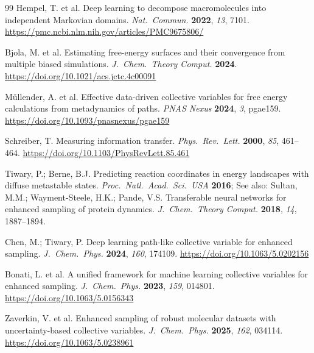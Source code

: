 \documentclass[12pt, a4paper]{article}
\begin{document}
\begin{thebibliography}{99}
Hempel, T. et al.
\newblock Deep learning to decompose macromolecules into independent Markovian domains.
\newblock \emph{Nat.\ Commun.} \textbf{2022}, \emph{13}, 7101.
\newblock \url{https://pmc.ncbi.nlm.nih.gov/articles/PMC9675806/}

Bjola, M. et al.
\newblock Estimating free-energy surfaces and their convergence from multiple biased simulations.
\newblock \emph{J.\ Chem.\ Theory Comput.} \textbf{2024}.
\newblock \url{https://doi.org/10.1021/acs.jctc.4c00091}

M\"{u}llender, A. et al.
\newblock Effective data-driven collective variables for free energy calculations from metadynamics of paths.
\newblock \emph{PNAS Nexus} \textbf{2024}, \emph{3}, pgae159.
\newblock \url{https://doi.org/10.1093/pnasnexus/pgae159}

Schreiber, T.
\newblock Measuring information transfer.
\newblock \emph{Phys.\ Rev.\ Lett.} \textbf{2000}, \emph{85}, 461--464.
\newblock \url{https://doi.org/10.1103/PhysRevLett.85.461}

Tiwary, P.; Berne, B.J.
\newblock Predicting reaction coordinates in energy landscapes with diffuse metastable states.
\newblock \emph{Proc.\ Natl.\ Acad.\ Sci.\ USA} \textbf{2016}; 
\newblock See also: Sultan, M.M.; Wayment-Steele, H.K.; Pande, V.S.
\newblock Transferable neural networks for enhanced sampling of protein dynamics.
\newblock \emph{J.\ Chem.\ Theory Comput.} \textbf{2018}, \emph{14}, 1887--1894.

Chen, M.; Tiwary, P.
\newblock Deep learning path-like collective variable for enhanced sampling.
\newblock \emph{J.\ Chem.\ Phys.} \textbf{2024}, \emph{160}, 174109.
\newblock \url{https://doi.org/10.1063/5.0202156}

Bonati, L. et al.
\newblock A unified framework for machine learning collective variables for enhanced sampling.
\newblock \emph{J.\ Chem.\ Phys.} \textbf{2023}, \emph{159}, 014801.
\newblock \url{https://doi.org/10.1063/5.0156343}

Zaverkin, V. et al.
\newblock Enhanced sampling of robust molecular datasets with uncertainty-based collective variables.
\newblock \emph{J.\ Chem.\ Phys.} \textbf{2025}, \emph{162}, 034114.
\newblock \url{https://doi.org/10.1063/5.0238961}


\end{thebibliography}
\end{document}
